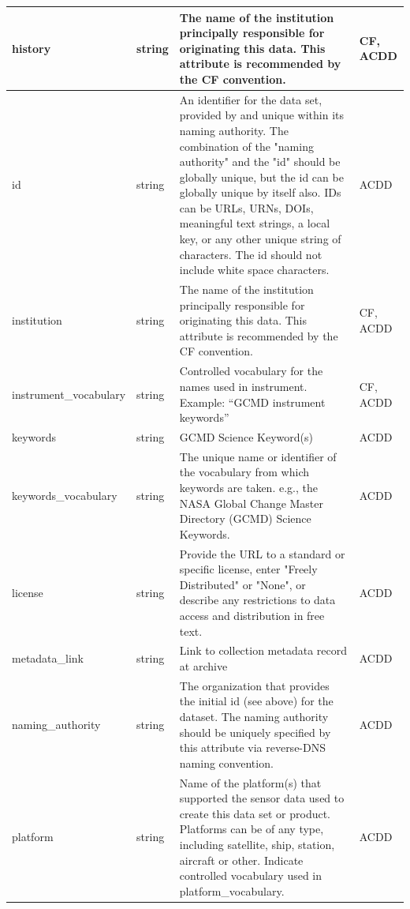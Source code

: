 \begin{longtable}{|p{}|p{}|p{}|p{}|}
\rowcolor{cyan!25} 
history & string & The name of the institution principally responsible for originating this data. This attribute is recommended by the CF convention. & CF, ACDD \\ \hline

\rowcolor{cyan!25} 
id & string & An identifier for the data set, provided by and unique within its naming authority. The combination of the "naming authority" and the "id" should be globally unique, but the id can be globally unique by itself also. IDs can be URLs, URNs, DOIs, meaningful text strings, a local key, or any other unique string of characters. The id should not include white space characters. & ACDD \\ \hline

\rowcolor{cyan!25} 
institution & string & The name of the institution principally responsible for originating this data. This attribute is recommended by the CF convention. & CF, ACDD \\ \hline

\rowcolor{cyan!25} 
instrument\_vocabulary & string & Controlled vocabulary for the names used in instrument.  Example: “GCMD instrument keywords” & CF, ACDD \\ \hline

\rowcolor{cyan!25} 
keywords & string & GCMD Science Keyword(s) & ACDD \\ \hline

\rowcolor{cyan!25} 
keywords\_vocabulary & string & The unique name or identifier of the vocabulary from which keywords are taken. e.g., the NASA Global Change Master Directory (GCMD) Science Keywords. & ACDD \\ \hline

\rowcolor{cyan!25} 
license & string & Provide the URL to a standard or specific license, enter "Freely Distributed" or "None", or describe any restrictions to data access and distribution in free text. & ACDD \\ \hline

\rowcolor{cyan!25} 
metadata\_link & string & Link to collection metadata record at archive & ACDD \\ \hline

\rowcolor{cyan!25} 
naming\_authority & string & The organization that provides the initial id (see above) for the dataset. The naming authority should be uniquely specified by this attribute via reverse-DNS naming convention. & ACDD \\ \hline

\rowcolor{cyan!25} 
platform & string & Name of the platform(s) that supported the sensor data used to create this data set or product. Platforms can be of any type, including satellite, ship, station, aircraft or other. Indicate controlled vocabulary used in platform\_vocabulary. & ACDD \\ \hline


\end{longtable}
